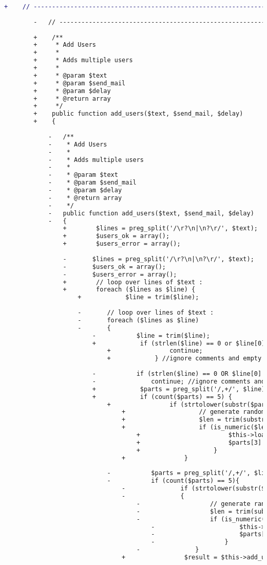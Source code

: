 \begin{lstlisting}[language=diff, caption=Perubahan pada kode User\_model.php]
		+    // ------------------------------------------------------------------------
		
		-	// ------------------------------------------------------------------------
		
		+    /**
		+     * Add Users
		+     *
		+     * Adds multiple users
		+     *
		+     * @param $text
		+     * @param $send_mail
		+     * @param $delay
		+     * @return array
		+     */
		+    public function add_users($text, $send_mail, $delay)
		+    {
			
			-	/**
			-	 * Add Users
			-	 *
			-	 * Adds multiple users
			-	 *
			-	 * @param $text
			-	 * @param $send_mail
			-	 * @param $delay
			-	 * @return array
			-	 */
			-	public function add_users($text, $send_mail, $delay)
			-	{
				+        $lines = preg_split('/\r?\n|\n?\r/', $text);
				+        $users_ok = array();
				+        $users_error = array();
				
				-		$lines = preg_split('/\r?\n|\n?\r/', $text);
				-		$users_ok = array();
				-		$users_error = array();
				+        // loop over lines of $text :
				+        foreach ($lines as $line) {
					+            $line = trim($line);
					
					-		// loop over lines of $text :
					-		foreach ($lines as $line)
					-		{
						-			$line = trim($line);
						+            if (strlen($line) == 0 or $line[0] == '#') {
							+                continue;
							+            } //ignore comments and empty lines
						
						-			if (strlen($line) == 0 OR $line[0] == '#')
						-				continue; //ignore comments and empty lines
						+            $parts = preg_split('/,+/', $line);
						+            if (count($parts) == 5) {
							+                if (strtolower(substr($parts[3], 0, 6)) == 'random') {
								+                    // generate random password
								+                    $len = trim(substr($parts[3], 6), '[]');
								+                    if (is_numeric($len)) {
									+                        $this->load->helper('string');
									+                        $parts[3] = shj_random_password($len);
									+                    }
								+                }
							
							-			$parts = preg_split('/,+/', $line);
							-			if (count($parts) == 5){
								-				if (strtolower(substr($parts[3], 0, 6)) == 'random')
								-				{
									-					// generate random password
									-					$len = trim(substr($parts[3], 6), '[]');
									-					if (is_numeric($len)){
										-						$this->load->helper('string');
										-						$parts[3] = shj_random_password($len);
										-					}
									-				}
								+                $result = $this->add_user($parts[0], $parts[1], $parts[2], $parts[3], $parts[4]);
								

\end{lstlisting}
